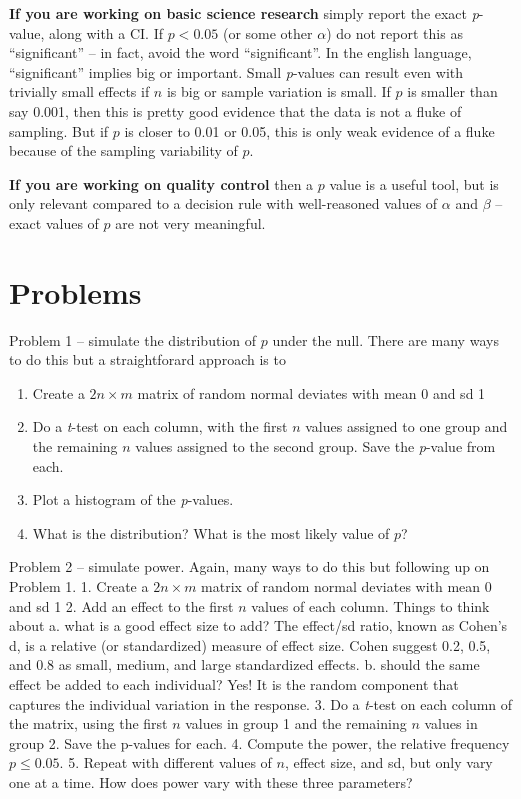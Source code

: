 \documentclass[]{book}
\providecommand{\tightlist}{%
  \setlength{\itemsep}{0pt}\setlength{\parskip}{0pt}}
\begin{document}
\textbf{If you are working on basic science research} simply report the
exact \emph{p}-value, along with a CI. If \(p < 0.05\) (or some other
\(\alpha\)) do not report this as ``significant'' -- in fact, avoid the
word ``significant''. In the english language, ``significant'' implies
big or important. Small \emph{p}-values can result even with trivially
small effects if \(n\) is big or sample variation is small. If \(p\) is
smaller than say 0.001, then this is pretty good evidence that the data
is not a fluke of sampling. But if \(p\) is closer to 0.01 or 0.05, this
is only weak evidence of a fluke because of the sampling variability of
\(p\).

\textbf{If you are working on quality control} then a \(p\) value is a
useful tool, but is only relevant compared to a decision rule with
well-reasoned values of \(\alpha\) and \(\beta\) -- exact values of
\(p\) are not very meaningful.

\section{Problems}\label{problems-1}

Problem 1 -- simulate the distribution of \(p\) under the null. There
are many ways to do this but a straightforard approach is to

\begin{enumerate}
\def\labelenumi{\arabic{enumi}.}
\tightlist
\item
  Create a \(2n \times m\) matrix of random normal deviates with mean 0
  and sd 1
\item
  Do a \emph{t}-test on each column, with the first \(n\) values
  assigned to one group and the remaining \(n\) values assigned to the
  second group. Save the \emph{p}-value from each.
\item
  Plot a histogram of the \emph{p}-values.
\item
  What is the distribution? What is the most likely value of \(p\)?
\end{enumerate}

Problem 2 -- simulate power. Again, many ways to do this but following
up on Problem 1. 1. Create a \(2n \times m\) matrix of random normal
deviates with mean 0 and sd 1 2. Add an effect to the first \(n\) values
of each column. Things to think about a. what is a good effect size to
add? The effect/sd ratio, known as Cohen's d, is a relative (or
standardized) measure of effect size. Cohen suggest 0.2, 0.5, and 0.8 as
small, medium, and large standardized effects. b. should the same effect
be added to each individual? Yes! It is the random component that
captures the individual variation in the response. 3. Do a \emph{t}-test
on each column of the matrix, using the first \(n\) values in group 1
and the remaining \(n\) values in group 2. Save the p-values for each.
4. Compute the power, the relative frequency \(p \le 0.05\). 5. Repeat
with different values of \(n\), effect size, and sd, but only vary one
at a time. How does power vary with these three parameters?
\end{document}

